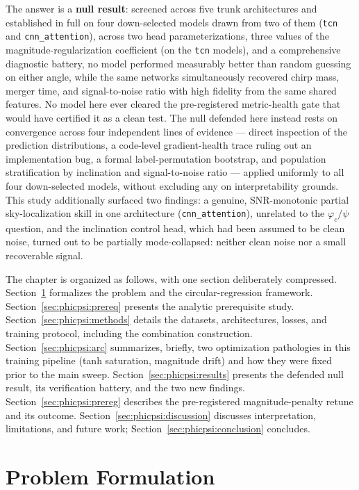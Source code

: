 The answer is a \textbf{null result}: screened across five trunk architectures and established in full on four down-selected models drawn from two of them (\texttt{tcn} and \texttt{cnn\_attention}), across two head parameterizations, three values of the magnitude-regularization coefficient (on the \texttt{tcn} models), and a comprehensive diagnostic battery, no model performed measurably better than random guessing on either angle, while the same networks simultaneously recovered chirp mass, merger time, and signal-to-noise ratio with high fidelity from the same shared features.
No model here ever cleared the pre-registered metric-health gate that would have certified it as a clean test.
The null defended here instead rests on convergence across four independent lines of evidence --- direct inspection of the prediction distributions, a code-level gradient-health trace ruling out an implementation bug, a formal label-permutation bootstrap, and population stratification by inclination and signal-to-noise ratio --- applied uniformly to all four down-selected models, without excluding any on interpretability grounds.
This study additionally surfaced two findings: a genuine, SNR-monotonic partial sky-localization skill in one architecture (\texttt{cnn\_attention}), unrelated to the $\varphi_c/\psi$ question, and the inclination control head, which had been assumed to be clean noise, turned out to be partially mode-collapsed: neither clean noise nor a small recoverable signal.

The chapter is organized as follows, with one section deliberately compressed.
Section~\ref{sec:phicpsi:problem} formalizes the problem and the circular-regression framework.
Section~\ref{sec:phicpsi:prereq} presents the analytic prerequisite study.
Section~\ref{sec:phicpsi:methods} details the datasets, architectures, losses, and training protocol, including the combination construction.
Section~\ref{sec:phicpsi:arc} summarizes, briefly, two optimization pathologies in this training pipeline (tanh saturation, magnitude drift) and how they were fixed prior to the main sweep.
Section~\ref{sec:phicpsi:results} presents the defended null result, its verification battery, and the two new findings.
Section~\ref{sec:phicpsi:prereg} describes the pre-registered magnitude-penalty retune and its outcome.
Section~\ref{sec:phicpsi:discussion} discusses interpretation, limitations, and future work; Section~\ref{sec:phicpsi:conclusion} concludes.


\section{Problem Formulation}
\label{sec:phicpsi:problem}

